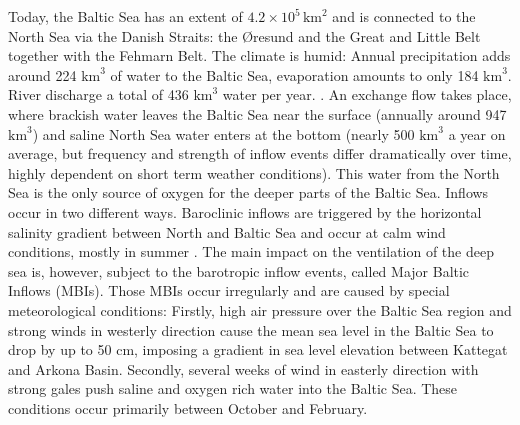 Today, the Baltic Sea has an extent of $4.2 \times 10^{5} \, \text{km}^2$ 
\citep[][]{balticsea} and is connected to the North Sea via the Danish Straits: 
the \O resund and the Great and Little Belt together with the Fehmarn Belt. The 
climate is humid: Annual precipitation adds around 224 $\text{km}^3$ of water to 
the Baltic Sea, evaporation amounts to only 184 $\text{km}^3$. River discharge a 
total of 436 $\text{km}^3$ water per year. \citep[][]{reissmann2009}. An 
exchange flow takes place, where brackish water leaves the Baltic Sea near the 
surface (annually around 947 $\text{km}^3$) and saline North Sea water enters at 
the bottom (nearly 500 $\text{km}^3$ a year on average, but frequency and 
strength of inflow events differ dramatically over time, highly dependent on 
short term weather conditions). This water from the North Sea is the only 
source of oxygen for the deeper parts of the Baltic Sea. Inflows occur in two 
different ways. Baroclinic inflows are triggered by the horizontal salinity 
gradient between North and Baltic Sea and occur at calm wind conditions, mostly 
in summer \citep[][]{reissmann2009}. The main impact on the ventilation of the 
deep sea is, however, subject to the barotropic inflow events, called Major 
Baltic Inflows (MBIs). Those MBIs occur irregularly and are caused by special 
meteorological conditions: Firstly, high air pressure over the Baltic Sea 
region and strong winds in westerly direction cause the mean sea level in the 
Baltic Sea to drop by up to 50 cm, imposing a gradient in sea level elevation 
between Kattegat and Arkona Basin. Secondly, several weeks of wind in easterly 
direction with strong gales \citep[][]{balticsea, reissmann2009, mohrholz2015} 
push saline and oxygen rich water into the Baltic Sea. These conditions occur 
primarily between October and February. 

